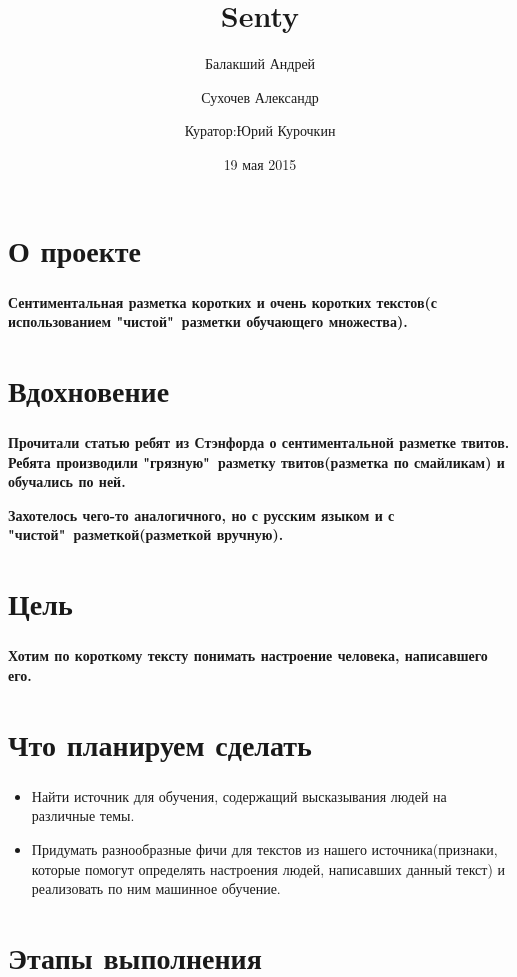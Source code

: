 \documentclass[t]{beamer}
\title{Senty}
\author{Балакший Андрей \and Сухочев Александр 
	\and \newline Куратор:Юрий Курочкин}
\date{19 мая 2015}
\institute[Computer Science Center]
\begin{document}
	\frame[plain]{\titlepage}
	
	
	\section{О проекте}
	\begin{frame}
		\frametitle{\insertsection}
		\textbf{Сентиментальная разметка коротких и очень коротких текстов(с использованием "чистой"\ разметки обучающего множества).}
	\end{frame}
	
	
	\section{Вдохновение}
	\begin{frame}
		\frametitle{\insertsection}
		\textbf{Прочитали статью ребят из Стэнфорда о сентиментальной разметке твитов. Ребята производили "грязную"\ разметку твитов(разметка по смайликам) и обучались по ней.}\pause
		
		\textbf{Захотелось чего-то аналогичного, но с русским языком и с "чистой"\ разметкой(разметкой вручную).}
	\end{frame}
	
	
	\section{Цель}
	\begin{frame}
		\frametitle{\insertsection}
		\textbf{Хотим по короткому тексту понимать настроение человека, написавшего его.}
	\end{frame}
	
	
	\section{Что планируем сделать}
	\begin{frame}
		\frametitle{\insertsection}
		\begin{itemize}
			\item Найти источник для обучения, содержащий высказывания людей на различные темы.	
			\item Придумать разнообразные фичи для текстов из нашего источника(признаки, которые помогут определять настроения людей, написавших данный текст) и реализовать по ним машинное обучение.
		\end{itemize}
	\end{frame}
	
	
	\section{Этапы выполнения}
\end{document}
